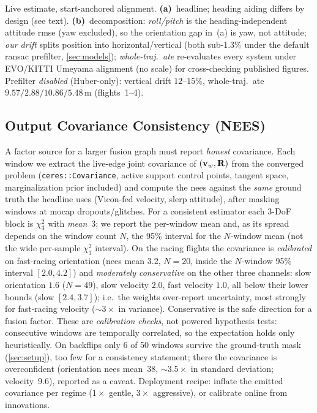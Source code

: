 \begin{table}[t]
\vspace{2pt}

\parbox{\columnwidth}{\raggedright\scriptsize Live estimate, start-anchored
  alignment.  \textbf{(a)}~headline; heading aiding differs by design (see
  text).  \textbf{(b)}~decomposition: \emph{roll/pitch} is the
  heading-independent attitude \ac{rmse} (yaw excluded), so the orientation
  gap in~(a) is yaw, not attitude; \emph{our drift} splits position into
  horizontal/vertical (both sub-1.3\% under the default \ac{ransac} prefilter,
  \autoref{sec:models}); \emph{whole-traj.\ \ac{ate}} re-evaluates every system
  under EVO/KITTI Umeyama alignment (no scale) for cross-checking published
  figures.  Prefilter \emph{disabled} (Huber-only): vertical drift
  $12$--$15\%$, whole-traj.\ \ac{ate} $9.57/2.88/10.86/5.48$\,m (flights~1--4).\par}
\end{table}

\subsection{Output Covariance Consistency (NEES)}
\label{sec:nees}
A factor source for a larger fusion graph must report \emph{honest}
covariance.  Each window we extract the live-edge joint covariance of
$(\mathbf{v}_w, \mathbf{R})$ from the converged problem (\texttt{ceres::Covariance},
active support control points, tangent space, marginalization prior
included) and compute the \ac{nees} against the \emph{same} ground truth the
headline uses (Vicon-fed velocity, slerp attitude), after masking windows at
\ac{mocap} dropouts/glitches.  For a consistent estimator each 3-DoF block is
$\chi^2_3$ with \emph{mean}~3; we report the per-window mean and, as its
spread depends on the window count $N$, the 95\% interval for the
$N$-window mean (not the wide per-sample $\chi^2_3$ interval).
On the racing flights the covariance is \emph{calibrated} on fast-racing
orientation (\ac{nees} mean $3.2$, $N{=}20$, inside the $N$-window 95\%
interval $[2.0,4.2]$) and \emph{moderately conservative} on the other three
channels: slow orientation $1.6$ ($N{=}49$), slow velocity $2.0$, fast
velocity $1.0$, all below their lower bounds (slow $[2.4,3.7]$); i.e.\ the
weights over-report uncertainty, most strongly for fast-racing velocity
(${\sim}3\times$ in variance).  Conservative is the safe direction for a fusion
factor.  These are \emph{calibration checks}, not powered hypothesis tests:
consecutive windows are temporally correlated, so the expectation holds only
heuristically.  On backflips only 6 of 50 windows
survive the ground-truth mask (\autoref{sec:setup}), too few for a
consistency statement; there the covariance is overconfident (orientation
\ac{nees} mean~38, ${\sim}3.5\times$ in standard deviation; velocity~9.6),
reported as a caveat.  Deployment recipe: inflate the emitted covariance per
regime ($1\times$ gentle, $3\times$ aggressive), or calibrate online from
innovations.

